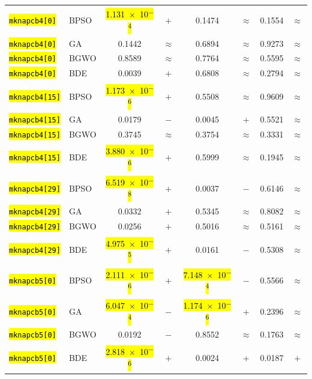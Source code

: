 \documentclass[mathematics,article,accept,moreauthors]{Definitions/mdpi}
\begin{document}
\begin{table}[H]
\begin{tabularx}{\textwidth}{Xlcccccc}
    \texttt{\hl{mknapcb4[0]}} & BPSO  & \hl{1.131~$\times$~10\textsuperscript{$-$4}} & $+$ &    0.1474 & $\approx$ &    0.1554 & $\approx$ \\
    \texttt{\hl{mknapcb4[0]}} & GA    &    0.1442 & $\approx$ &    0.6894 & $\approx$ &    0.9273 & $\approx$ \\
    \texttt{\hl{mknapcb4[0]}} & BGWO  &    0.8589 & $\approx$ &    0.7764 & $\approx$ &    0.5595 & $\approx$ \\
    \texttt{\hl{mknapcb4[0]}} & BDE   &    0.0039 & $+$ &    0.6808 & $\approx$ &    0.2794 & $\approx$ \\
    \midrule
    \texttt{\hl{mknapcb4[15]}} & BPSO  & \hl{1.173~$\times$~10\textsuperscript{$-$6}} & $+$ &    0.5508 & $\approx$ &    0.9609 & $\approx$ \\
    \texttt{\hl{mknapcb4[15]}} & GA    &    0.0179 & $-$ &    0.0045 & $+$ &    0.5521 & $\approx$ \\
    \texttt{\hl{mknapcb4[15]}} & BGWO  &    0.3745 & $\approx$ &    0.3754 & $\approx$ &    0.3331 & $\approx$ \\
    \texttt{\hl{mknapcb4[15]}} & BDE   & \hl{3.880~$\times$~10\textsuperscript{$-$6}} & $+$ &    0.5999 & $\approx$ &    0.1945 & $\approx$ \\
    \midrule
    \texttt{\hl{mknapcb4[29]}} & BPSO  & \hl{6.519~$\times$~10\textsuperscript{$-$8}} & $+$ &    0.0037 & $-$ &    0.6146 & $\approx$ \\
    \texttt{\hl{mknapcb4[29]}} & GA    &    0.0332 & $+$ &    0.5345 & $\approx$ &    0.8082 & $\approx$ \\
    \texttt{\hl{mknapcb4[29]}} & BGWO  &    0.0256 & $+$ &    0.5016 & $\approx$ &    0.5161 & $\approx$ \\
    \texttt{\hl{mknapcb4[29]}} & BDE   & \hl{4.975~$\times$~10\textsuperscript{$-$5}} & $+$ &    0.0161 & $-$ &    0.5308 & $\approx$ \\
    \midrule
    \texttt{\hl{mknapcb5[0]}} & BPSO  & \hl{2.111~$\times$~10\textsuperscript{$-$6}} & $+$ & \hl{7.148~$\times$~10\textsuperscript{$-$4}} & $-$ &    0.5566 & $\approx$ \\
    \texttt{\hl{mknapcb5[0]}} & GA    & \hl{6.047~$\times$~10\textsuperscript{$-$4}} & $-$ & \hl{1.174~$\times$~10\textsuperscript{$-$6}} & $+$ &    0.2396 & $\approx$ \\
    \texttt{\hl{mknapcb5[0]}} & BGWO  &    0.0192 & $-$ &    0.8552 & $\approx$ &    0.1763 & $\approx$ \\
    \texttt{\hl{mknapcb5[0]}} & BDE   & \hl{2.818~$\times$~10\textsuperscript{$-$6}} & $+$ &    0.0024 & $+$ &    0.0187 & $+$ \\

\end{tabularx}
\end{table}
\end{document}
